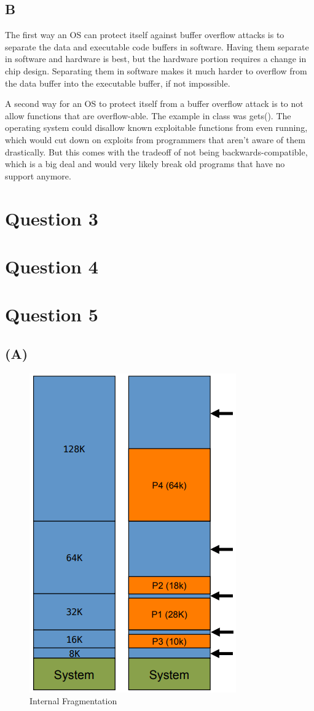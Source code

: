 \documentclass[12pt]{article}
\begin{document}
	\subsection*{B}
	The first way an OS can protect itself against buffer overflow attacks is to separate the data and executable code buffers in software. Having them separate in software and hardware is best, but the hardware portion requires a change in chip design. Separating them in software makes it much harder to overflow from the data buffer into the executable buffer, if not impossible. 
	
	A second way for an OS to protect itself from a buffer overflow attack is to not allow functions that are overflow-able. The example in class was gets(). The operating system could disallow known exploitable functions from even running, which would cut down on exploits from programmers that aren't aware of them drastically. But this comes with the tradeoff of not being backwards-compatible, which is a big deal and would very likely break old programs that have no support anymore. 
	
	
	\section*{Question 3}
	
	
	\section*{Question 4}
	
	
	
	\section*{Question 5}	
	\subsection*{(A)}
	\begin{figure}
		\centering
		\includegraphics[width=0.3\columnwidth]{internal-fragmentation}
		\caption{Internal Fragmentation}
		\label{int-frag}
	\end{figure}
	
\end{document}
